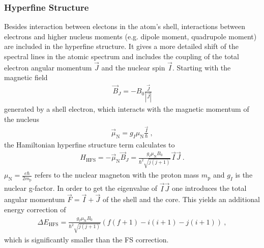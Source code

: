 \subsubsection{Hyperfine Structure}
\label{toc:HyperFineStructure}

Besides interaction between electons in the atom's shell, interactions between electrons and higher nucleus moments (e.g. dipole moment, quadrupole moment) are included in the hyperfine structure. 
It gives a more detailed shift of the spectral lines in the atomic spectrum and includes the coupling of the total electron angular momentum $\vec{J}$ and the nuclear spin $\vec{I}$. 
Starting with the magnetic field 
	\begin{align}
		\vec{B}_{J} = -B_0 \frac{\vec{J}}{|\vec{J}|}
	\end{align}
generated by a shell electron, which interacts with the magnetic momentum of the nucleus
	\begin{align}
		\vec{\mu}_{\text{N}} = g_{I}\mu_{\text{N}}\frac{\vec{I}}{\hbar}\ ,
	\end{align}
the Hamiltonian hyperfine structure term calculates to
	\begin{align}
		H_{\text{HFS}} = -\vec{\mu}_{\text{N}}\vec{B}_{J} = \frac{g_{I}\mu_{\text{N}}B_0}{\hbar^2\sqrt{j(j+1)}}\vec{I}\vec{J}\ .
	\end{align}
$\mu_{\text{N}} = \frac{e\hbar}{2m_{\text{p}}}$ refers to the nuclear magneton with the proton mass $m_{\text{p}}$ and $g_{I}$ is the nuclear g-factor. In order to get the eigenvalue of $\vec{I}\vec{J}$ one introduces the total angular momentum $\vec{F} = \vec{I} + \vec{J}$ of the shell and the core. 
This yields an additional energy correction of
	\begin{align}
		 \Delta E_{\text{HFS}} = \frac{g_{I}\mu_{\text{N}}B_0}{\hbar^2\sqrt{j(j+1)}}(f(f+1)-i(i+1)-j(i+1))\ ,
	\end{align}
which is significantly smaller than the FS correction.
